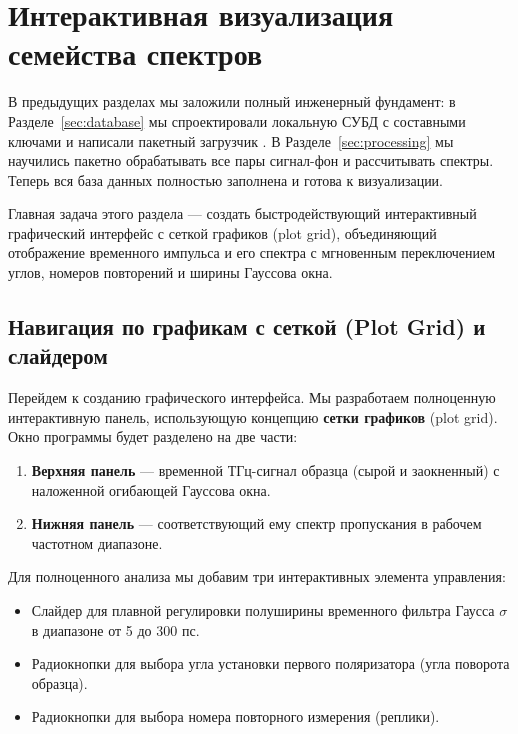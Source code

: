 
\section{Интерактивная визуализация семейства спектров}\label{sec:interactivity}

В предыдущих разделах мы заложили полный инженерный фундамент: в Разделе~\ref{sec:database} мы спроектировали локальную СУБД с составными ключами и написали пакетный загрузчик . В Разделе~\ref{sec:processing} мы научились пакетно обрабатывать все пары сигнал-фон и рассчитывать спектры. Теперь вся база данных полностью заполнена и готова к визуализации.

Главная задача этого раздела --- создать быстродействующий интерактивный графический интерфейс с сеткой графиков (plot grid), объединяющий отображение временного импульса и его спектра с мгновенным переключением углов, номеров повторений и ширины Гауссова окна.

\subsection{Навигация по графикам с сеткой (Plot Grid) и слайдером}

Перейдем к созданию графического интерфейса. Мы разработаем полноценную интерактивную панель, использующую концепцию \textbf{сетки графиков} (plot grid). Окно программы будет разделено на две части:
\begin{enumerate}
    \item \textbf{Верхняя панель} --- временной ТГц-сигнал образца (сырой и заокненный) с наложенной огибающей Гауссова окна.
    \item \textbf{Нижняя панель} --- соответствующий ему спектр пропускания в рабочем частотном диапазоне.
\end{enumerate}

Для полноценного анализа мы добавим три интерактивных элемента управления:
\begin{itemize}
    \item Слайдер для плавной регулировки полуширины временного фильтра Гаусса $\sigma$ в диапазоне от 5 до 300 пс.
    \item Радиокнопки для выбора угла установки первого поляризатора (угла поворота образца).
    \item Радиокнопки для выбора номера повторного измерения (реплики).
\end{itemize}

